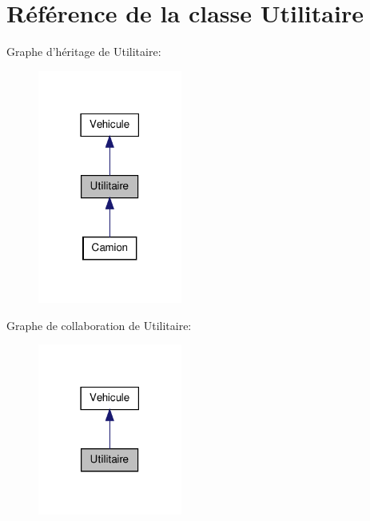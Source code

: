 \hypertarget{class_utilitaire}{
\section{Référence de la classe Utilitaire}
\label{class_utilitaire}
}


Graphe d'héritage de Utilitaire:
\nopagebreak
\begin{figure}[H]
\begin{center}
\leavevmode
\includegraphics[width=134pt]{class_utilitaire__inherit__graph}
\end{center}
\end{figure}


Graphe de collaboration de Utilitaire:\nopagebreak
\begin{figure}[H]
\begin{center}
\leavevmode
\includegraphics[width=134pt]{class_utilitaire__coll__graph}
\end{center}
\end{figure}
